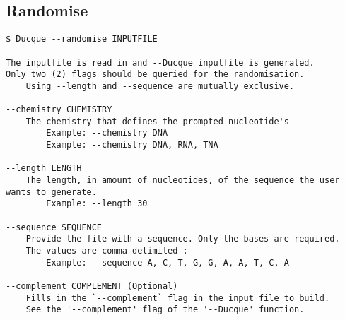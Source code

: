 \pagebreak
\subsection{Randomise}




\small
\begin{verbatim}
$ Ducque --randomise INPUTFILE

The inputfile is read in and --Ducque inputfile is generated.
Only two (2) flags should be queried for the randomisation.
    Using --length and --sequence are mutually exclusive.

--chemistry CHEMISTRY
    The chemistry that defines the prompted nucleotide's
        Example: --chemistry DNA
        Example: --chemistry DNA, RNA, TNA
    
--length LENGTH
    The length, in amount of nucleotides, of the sequence the user wants to generate.
        Example: --length 30

--sequence SEQUENCE
    Provide the file with a sequence. Only the bases are required.
    The values are comma-delimited :
        Example: --sequence A, C, T, G, G, A, A, T, C, A

--complement COMPLEMENT (Optional)
    Fills in the `--complement` flag in the input file to build.
    See the '--complement' flag of the '--Ducque' function.
\end{verbatim}
\normalsize
